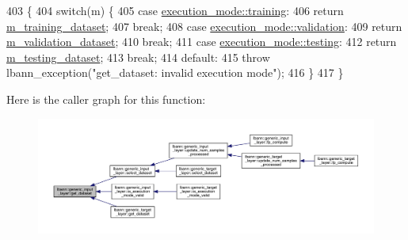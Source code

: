\begin{DoxyCode}
403                                                   \{
404     \textcolor{keywordflow}{switch}(m) \{
405     \textcolor{keywordflow}{case} \hyperlink{base_8hpp_a2781a159088df64ed7d47cc91c4dc0a8ac185ddac8b5a8f5aa23c5b80bc12d214}{execution\_mode::training}:
406       \textcolor{keywordflow}{return} \hyperlink{classlbann_1_1generic__input__layer_a23716635b1062bfe57f7fcf75140a63a}{m\_training\_dataset};
407       \textcolor{keywordflow}{break};
408     \textcolor{keywordflow}{case} \hyperlink{base_8hpp_a2781a159088df64ed7d47cc91c4dc0a8aa617908b172c473cb8e8cda059e55bf0}{execution\_mode::validation}:
409       \textcolor{keywordflow}{return} \hyperlink{classlbann_1_1generic__input__layer_abd70adf607d1cef87fb6641af77e816d}{m\_validation\_dataset};
410       \textcolor{keywordflow}{break};
411     \textcolor{keywordflow}{case} \hyperlink{base_8hpp_a2781a159088df64ed7d47cc91c4dc0a8aae2b1fca515949e5d54fb22b8ed95575}{execution\_mode::testing}:
412       \textcolor{keywordflow}{return} \hyperlink{classlbann_1_1generic__input__layer_a66b9ec6b393695232bd98edc62fc1348}{m\_testing\_dataset};
413       \textcolor{keywordflow}{break};
414     \textcolor{keywordflow}{default}:
415       \textcolor{keywordflow}{throw} lbann\_exception(\textcolor{stringliteral}{"get\_dataset: invalid execution mode"});
416     \}
417   \}
\end{DoxyCode}
Here is the caller graph for this function\+:\nopagebreak
\begin{figure}[H]
\begin{center}
\leavevmode
\includegraphics[width=350pt]{classlbann_1_1generic__input__layer_af5699540797c22d8846028e578a6fc59_icgraph}
\end{center}
\end{figure}
\mbox{\label{classlbann_1_1generic__input__layer_a909cf972d13a305a16daba9664180262}} 
